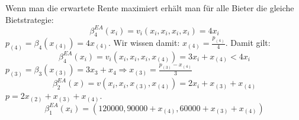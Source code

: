 \documentclass[12pt]{extreport} %
\theoremstyle{named}
\theoremstyle{itshape}
\theoremstyle{normal}
\begin{document}
Wenn man die erwartete Rente maximiert erhält man für alle Bieter die gleiche Bietstrategie:
$$ \beta_{4}^{EA}(x_{i}) = v_{i}(x_{i}, x_{i}, x_{i}, x_{i}) = 4 x_{i} $$
$p_{(4)} = \beta_{4}(x_{(4)}) = 4 x_{(4)}$. Wir wissen damit: $x_{(4)} = \frac{p_{(4)}}{4}$. Damit gilt:
$$  \beta_{4}^{EA}(x_{i}) = v_{i}(x_{i}, x_{i}, x_{i}, x_{(4)}) = 3 x_{i} + x_{(4)} < 4 x_{i}  $$
$p_{(3)} = \beta_{3}(x_{(3)}) = 3x_{3} + x_{4} \Rightarrow x_{(3)} = \frac{p_{(3)} - x_{(4)}}{3}$
$$ \beta_{2}^{EA}(x) = v(x_{i}, x_{i}, x_{(3)}, x_{(4)}) = 2x_{i} + x_{(3)} + x_{(4)} $$
$p = 2x_{(2)} + x_{(3)} + x_{(4)}$.
$$ \beta_{1}^{EA}(x_{i}) =\left( 120000, 90000 + x_{(4)}, 60000 + x_{(3)} + x_{(4)} \right) $$

\printindex
\end{document}
